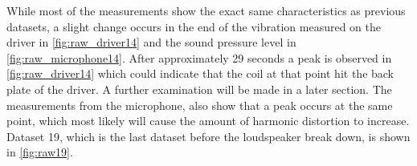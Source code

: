 %	
%	
%	

While most of the measurements show the exact same characteristics as previous datasets, a slight change occurs in the end of the vibration measured on the driver in \autoref{fig:raw_driver14} and the sound pressure level in \autoref{fig:raw_microphone14}. After approximately 29 seconds a peak is observed in \autoref{fig:raw_driver14} which could indicate that the coil at that point hit the back plate of the driver. A further examination will be made in a later section. The measurements from the microphone, also show that a peak occurs at the same point, which most likely will cause the amount of harmonic distortion to increase. Dataset 19, which is the last dataset before the loudspeaker break down, is shown in \autoref{fig:raw19}.

%	
%	
%	

